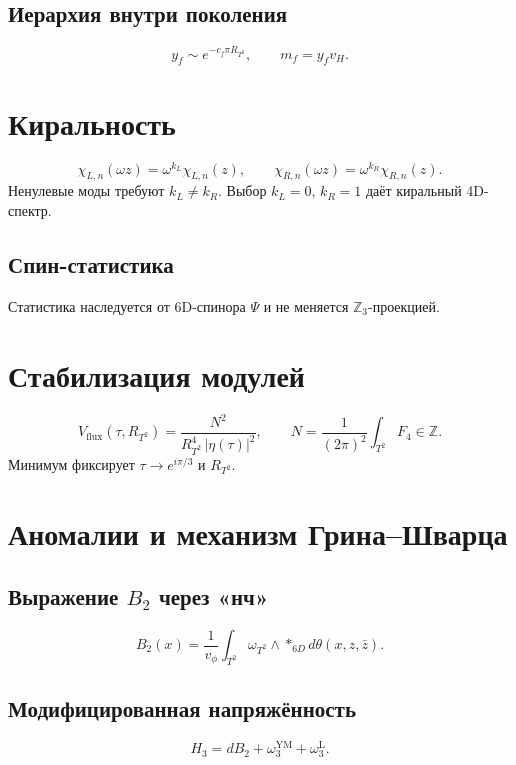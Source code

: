 \documentclass[11pt,letterpaper]{article}
\begin{document}
\subsection{Иерархия внутри поколения}
\begin{equation}
y_f \sim e^{-c_f \pi R_{T^2}}, \qquad m_f = y_f v_H .
\end{equation}

\section{Киральность}
\begin{equation}
\chi_{L,n}(\omega z) = \omega^{k_L} \chi_{L,n}(z), \qquad \chi_{R,n}(\omega z) = \omega^{k_R} \chi_{R,n}(z).
\end{equation}
Ненулевые моды требуют $k_L \neq k_R$. Выбор $k_L = 0$, $k_R = 1$ даёт киральный 4D-спектр.

\subsection{Спин-статистика}
Статистика наследуется от 6D-спинора $\Psi$ и не меняется $\mathbb{Z}_3$-проекцией.

\section{Стабилизация модулей}
\begin{equation}
V_{\text{flux}}(\tau, R_{T^2}) = \frac{N^2}{R_{T^2}^4 \, |\eta(\tau)|^2}, \qquad N = \frac{1}{(2\pi)^2} \int_{T^2} F_4 \in \mathbb{Z}.
\end{equation}
Минимум фиксирует $\tau \to e^{i\pi/3}$ и $R_{T^2}$.

\section{Аномалии и механизм Грина--Шварца}

\subsection{Выражение $B_2$ через «нч»}
\begin{equation}
\boxed{\; B_2(x) = \frac{1}{v_\phi} \int_{T^2} \omega_{T^2} \wedge *_{6D} d\theta(x, z, \bar{z}). \;}
\end{equation}

\subsection{Модифицированная напряжённость}
\begin{equation}
H_3 = dB_2 + \omega_3^{\text{YM}} + \omega_3^{\text{L}} .
\end{equation}
\end{document}
